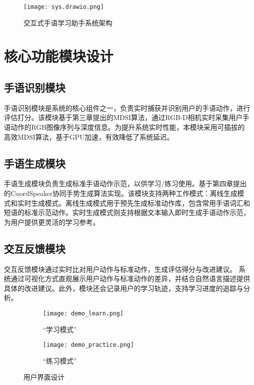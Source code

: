 \begin{figure}
    \centering
    \texttt{[image: sys.drawio.png]}
    \caption{交互式手语学习助手系统架构}
    \label{fig:system_arch}
  \end{figure}

\section{核心功能模块设计}

\subsection{手语识别模块}
手语识别模块是系统的核心组件之一，负责实时捕获并识别用户的手语动作，进行评估打分。该模块基于第三章提出的MDSI算法，通过RGB-D相机实时采集用户手语动作的RGB图像序列与深度信息。为提升系统实时性能，本模块采用可插拔的高效MDSI算法，基于GPU加速，有效降低了系统延迟。

\subsection{手语生成模块}
手语生成模块负责生成标准手语动作示范，以供学习/练习使用。基于第四章提出的CoordSpeaker协同手势生成算法实现。该模块支持两种工作模式：离线生成模式和实时生成模式。离线生成模式用于预先生成标准动作库，包含常用手语词汇和短语的标准示范动作。实时生成模式则支持根据文本输入即时生成手语动作示范，为用户提供更灵活的学习参考。

\subsection{交互反馈模块}
交互反馈模块通过实时比对用户动作与标准动作，生成评估得分与改进建议。%
系统通过可视化方式直观展示用户动作与标准动作的差异，并结合自然语言描述提供具体的改进建议。此外，模块还会记录用户的学习轨迹，支持学习进度的追踪与分析。


\begin{figure}
    \centering
    \begin{subfigure}[b]{0.7\linewidth}
        \centering
        \texttt{[image: demo\_learn.png]}
        \caption{“学习模式”}
    \end{subfigure}
    \hfill
    \begin{subfigure}[b]{0.7\linewidth}
        \centering
        \texttt{[image: demo\_practice.png]}
        \caption{“练习模式”}
    \end{subfigure}
    \caption{用户界面设计}
    \label{fig:ui_design}
\end{figure}
  
